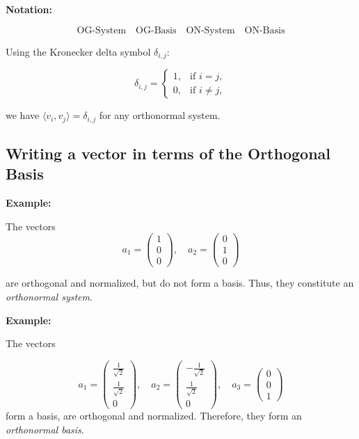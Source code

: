 \textbf{Notation:}

\[
    \text{OG-System} \quad \text{OG-Basis} \quad \text{ON-System} \quad \text{ON-Basis}
\]

Using the Kronecker delta symbol \( \delta_{i,j} \):

\[
    \delta_{i,j} =
    \begin{cases}
    1, & \text{if } i = j, \\
    0, & \text{if } i \neq j,
    \end{cases}
\]

we have \( \langle v_i, v_j \rangle = \delta_{i,j} \) for any orthonormal system.

\subsection{Writing a vector in terms of the Orthogonal Basis}

\textbf{Example:}
\vspace{\baselineskip} 

The vectors
\[
    a_1 =
    \begin{pmatrix}
    1 \\
    0 \\
    0
    \end{pmatrix}, \quad
    a_2 =
    \begin{pmatrix}
    0 \\
    1 \\
    0
    \end{pmatrix}
\]

are orthogonal and normalized, but do not form a basis. Thus, they constitute an 
\emph{orthonormal system}.
\vspace{\baselineskip}

\textbf{Example:}
\vspace{\baselineskip}
 
The vectors

\[
    a_1 =
    \begin{pmatrix}
    \frac{1}{\sqrt{2}} \\
    \frac{1}{\sqrt{2}} \\
    0
    \end{pmatrix}, \quad
    a_2 =
    \begin{pmatrix}
    -\frac{1}{\sqrt{2}} \\
    \frac{1}{\sqrt{2}} \\
    0
    \end{pmatrix}, \quad
    a_3 =
    \begin{pmatrix}
    0 \\
    0 \\
    1
    \end{pmatrix}
\]
form a basis, are orthogonal and normalized. Therefore, they form an \emph{orthonormal basis}.

